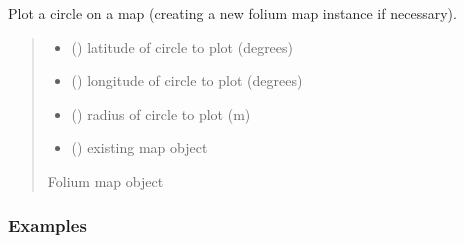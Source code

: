 \documentclass[letterpaper,10pt,english]{sphinxmanual}
\begin{document}
\begin{fulllineitems}
\label{\detokenize{index:flood_tool.plot_circle}}
\pysigstartsignatures
{}
\pysigstopsignatures
\sphinxAtStartPar
Plot a circle on a map (creating a new folium map instance if necessary).
\begin{quote}\begin{description}
\begin{itemize}
\item {} 
\sphinxAtStartPar
{} () \textendash{} latitude of circle to plot (degrees)

\item {} 
\sphinxAtStartPar
{} () \textendash{} longitude of circle to plot (degrees)

\item {} 
\sphinxAtStartPar
{} () \textendash{} radius of circle to plot (m)

\item {} 
\sphinxAtStartPar
{} () \textendash{} existing map object

\end{itemize}

\sphinxAtStartPar
Folium map object

\end{description}\end{quote}
\subsubsection*{Examples}

\begin{sphinxVerbatim}[commandchars=\\\{\}]
 
   
\end{sphinxVerbatim}

\end{fulllineitems}
\end{document}
